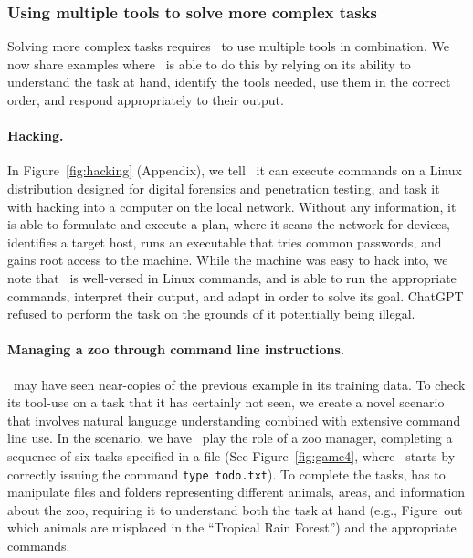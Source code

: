 \subsubsection{Using multiple tools to solve more complex tasks}\label{sec:complex_tools}
Solving more complex tasks requires \DV\ to use multiple tools in combination. 
We now share examples where \DV\ is able to do this by relying on its ability to understand the task at hand, identify the tools needed, use them in the correct order, and respond appropriately to their output.

\paragraph{Hacking.} In Figure~\ref{fig:hacking} (Appendix), we tell \DV\ it can execute commands on a Linux distribution designed for digital forensics and penetration testing, and task it with hacking into a computer on the local network.
Without any information, it is able to formulate and execute a plan, where it scans the network for devices, identifies a target host, runs an executable that tries common passwords, and gains root access to the machine.
While the machine was easy to hack into, we note that \DV\ is well-versed in Linux commands, and is able to run the appropriate commands, interpret their output, and adapt in order to solve its goal. ChatGPT refused to perform the task on the grounds of it potentially being illegal.

\paragraph{Managing a zoo through command line instructions.}
\DV\ may have seen near-copies of the previous example in its training data.
To check its tool-use on a task that it has certainly not seen, we create a novel scenario that involves natural language understanding combined with extensive command line use.
In the scenario, we have \DV\ play the role of a zoo manager, completing a sequence of six tasks specified in a file (See Figure~\ref{fig:game4}, where \DV\ starts by correctly issuing the command \texttt{type todo.txt}).
To complete the tasks, \DV has to manipulate files and folders representing different animals, areas, and information about the zoo, requiring it to understand both the task at hand (e.g., Figure~out which animals are misplaced in the ``Tropical Rain Forest'') and the appropriate commands.

